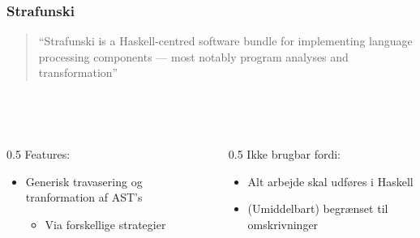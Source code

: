 \documentclass[slidestop,compress,mathserif, xcolor=dvipsnames]{beamer}
\begin{document}
\begin{frame}[c]
  \frametitle{Strafunski}

  \begin{quote}
    "`Strafunski is a Haskell-centred software bundle for implementing language
    processing components --- most notably program analyses and
    transformation"'\\ \raggedleft \cite{LV03-PADL}
  \end{quote}

  \ \\ \ \\

  \begin{columns}    
    \begin{column}{0.5\textwidth{}}
      Features:
      \begin{itemize}
      \item Generisk travasering og tranformation af AST's
        \begin{itemize}
        \item Via forskellige strategier
        \end{itemize}
      \end{itemize}
    \end{column}
    \begin{column}{0.5\textwidth{}}
      Ikke brugbar fordi:
      \begin{itemize}
      \item Alt arbejde skal udføres i Haskell
      \item (Umiddelbart) begrænset til omskrivninger
      \end{itemize}
    \end{column}

  \end{columns} 
\end{frame}
\end{document}
